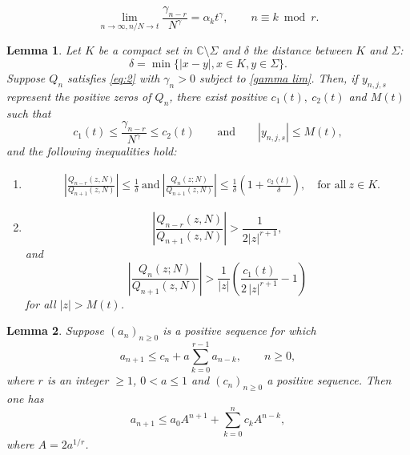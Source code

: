\documentclass[10pt,a4paper]{amsart}
\newtheorem{lemma}{Lemma}
\begin{document}
\begin{equation}\label{gamma lim}
	\lim_{n\to \infty, n/N\to t} \frac{\gamma_{n-r}}{N^\gamma} =  \alpha_k t^{\gamma}, \qquad  n \equiv k \bmod r. 
\end{equation}

\begin{lemma}\label{lem: ratio1} Let $K$ be a compact set in $\mathbb{C} \setminus \Sigma$ and $\delta$ the distance between $K$ and $\Sigma$:
\[   \delta = \min  \{ |x-y|, x \in K, y \in \Sigma \}.  \] 
Suppose $Q_n$ satisfies \eqref{eq:2} with $\gamma_n>0$ subject to \eqref{gamma lim}. Then,  if $y_{n,j,s}$ represent the positive zeros of $Q_n$, there exist positive $c_1(t), \ c_2(t)$ and  $M(t)$ such that 
\[ 
	c_1(t) \leq \frac{\gamma_{n-r}} {N^\gamma} \leq c_2 (t)
	\qquad \text{and}\qquad 
	\left| y_{n,j,s}\right|\leq M(t), 
\]
 and the following inequalities hold: 
\begin{enumerate}
\item[(a)]
\begin{align}
& \label{ratio r Qn}
		\left|\frac{Q_{n-r}(z,N)}{Q_{n+1}(z,N)}  \right|
	\leq  \frac{1}{\delta}
	\ \text{and}\ 
	 \left|\frac{ Q_n(z;N)}{Q_{n+1}(z,N)} \right|
	 \leq \frac{1}{\delta} \left( 1 + \frac{c_2(t)}{\delta}\right),  \quad\text{for all} \ z \in K. 
\end{align}

\item[(b)] 
\[
	\left| \frac{Q_{n-r}(z,N)}{Q_{n+1}(z,N)}  \right| > \frac{1}{2|z|^{r+1}} , \]
and 
\[ \left|\frac{ Q_n(z;N)}{Q_{n+1}(z,N)} \right| > \frac{1}{|z|}\left(   \frac{c_1(t)}{2\, |z|^{r+1}} -1\right) \]
for all $|z| > M(t)$.

\end{enumerate}
\end{lemma}

\begin{lemma}\label{lem:aux1}
Suppose $(a_n)_{n\geq 0}$ is a positive sequence for which
\begin{equation}  \label{ineq1}
    a_{n+1} \leq c_n + a \sum_{k=0}^{r-1} a_{n-k}, \qquad  n \geq 0, 
\end{equation}    
where $r$ is an integer $\geq 1$, $0 < a \leq 1$ and $(c_n)_{n \geq 0}$ a positive sequence. Then one has
\begin{equation}  \label{ineq2}
     a_{n+1} \leq   a_0 A^{n+1} + \sum_{k=0}^n c_k A^{n-k}, 
\end{equation}
where $A = 2 a^{1/r}$.
\end{lemma}
\end{document}
